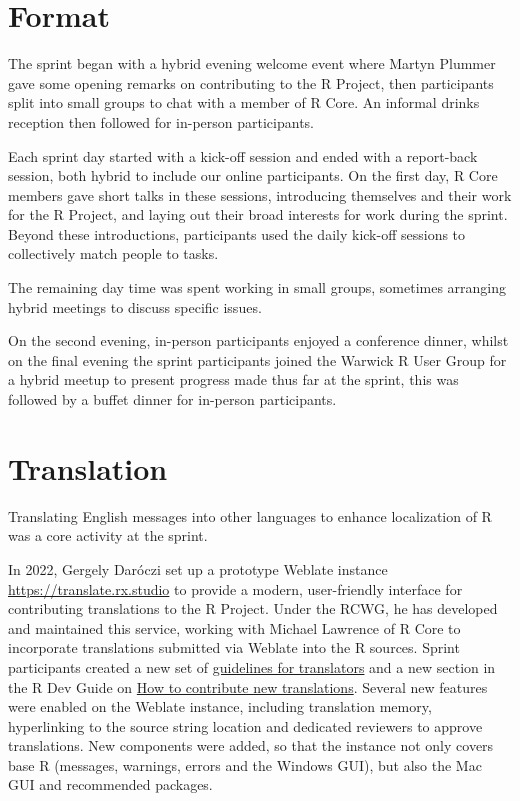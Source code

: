\hypertarget{format}{%
\section{Format}\label{format}}

The sprint began with a hybrid evening welcome event where Martyn Plummer gave some opening remarks on contributing to the R Project, then participants split into small groups to chat with a member of R Core. An informal drinks reception then followed for in-person participants.

Each sprint day started with a kick-off session and ended with a report-back session, both hybrid to include our online participants. On the first day, R Core members gave short talks in these sessions, introducing themselves and their work for the R Project, and laying out their broad interests for work during the sprint. Beyond these introductions, participants used the daily kick-off sessions to collectively match people to tasks.

The remaining day time was spent working in small groups, sometimes arranging
hybrid meetings to discuss specific issues.

On the second evening, in-person participants enjoyed a conference dinner, whilst on the final evening the sprint participants joined the Warwick R User Group for a hybrid meetup to present progress made thus far at the sprint, this was followed by a buffet dinner for in-person participants.

\hypertarget{translation}{%
\section{Translation}\label{translation}}

Translating English messages into other languages to enhance
localization of R was a core activity at the sprint.

In 2022, Gergely Daróczi set up a prototype Weblate instance \url{https://translate.rx.studio} to provide a modern, user-friendly interface for contributing translations to the R Project. Under the RCWG, he has developed and maintained this service, working with Michael Lawrence of R Core to incorporate translations submitted via Weblate into the R sources. Sprint participants created a new
set of \href{https://contributor.r-project.org/translations/}{guidelines for translators} and
a new section in the R Dev Guide on \href{https://contributor.r-project.org/rdevguide/message-translations.html\#how-to-contribute-new-translations}{How to contribute new translations}. Several new features were enabled on the Weblate instance,
including translation memory, hyperlinking to the source string location and
dedicated reviewers to approve translations. New components were added, so that
the instance not only covers base R (messages, warnings, errors and the
Windows GUI), but also the Mac GUI and recommended packages.

